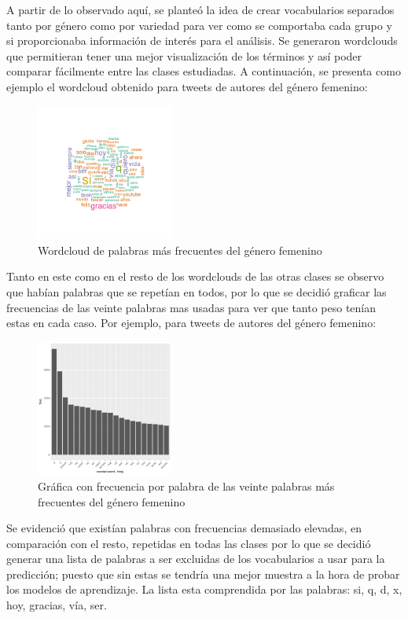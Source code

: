 \documentclass[11pt,a4paper]{article}
\begin{document}
A partir de lo observado aquí, se planteó la idea de crear vocabularios separados tanto por género como por variedad para ver como se comportaba cada grupo y si proporcionaba información de interés para el análisis. Se generaron wordclouds que permitieran tener una mejor visualización de los términos y así poder comparar fácilmente entre las clases estudiadas. A continuación, se presenta como ejemplo el wordcloud obtenido para tweets de autores del género femenino:

\begin{figure}[h!]
  \centering
    \includegraphics[width=0.4\textwidth]{0Female}
  \caption{Wordcloud de palabras más frecuentes del género femenino}
\end{figure}

Tanto en este como en el resto de los wordclouds de las otras clases se observo que habían palabras que se repetían en todos, por lo que se decidió graficar las frecuencias de las veinte palabras mas usadas para ver que tanto peso tenían estas en cada caso. Por ejemplo, para tweets de autores del género femenino:

\begin{figure}[h!]
  \centering
    \includegraphics[width=0.4\textwidth]{00Female-barras}
  \caption{Gráfica con frecuencia por palabra de las veinte palabras más frecuentes del género femenino}
\end{figure}

Se evidenció que existían palabras con frecuencias demasiado elevadas, en comparación con el resto, repetidas en todas las clases por lo que se decidió generar una lista de palabras a ser excluidas de los vocabularios a usar para la predicción; puesto que sin estas se tendría una mejor muestra a la hora de probar los modelos de aprendizaje. La lista esta comprendida por las palabras: si, q, d, x, hoy, gracias, vía, ser.
\end{document}
